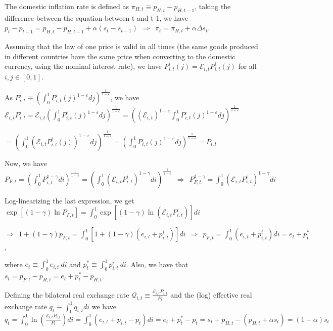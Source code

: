 \documentclass[
]{article}
\begin{document}
The domestic inflation rate is defined as
\(\displaystyle \pi_{H,t} \equiv p_{H,t}-p_{H,t-1}\), taking the
difference between the equation between t and t-1, we have
\(p_t-p_{t-1}=p_{H,t}-p_{H,t-1}+\alpha(s_t-s_{t-1}) \ \ \Rightarrow \ \ \pi_t = \pi_{H,t}+\alpha \Delta s_t\).

Assuming that the law of one price is valid in all times (the same goods
produced in different countries have the same price when converting to
the domestic currency, using the nominal interest rate), we have
\(P_{i,t}^i(j) = \mathcal{E}_{i,t}P_{i,t}^i(j)\) for all
\(i, j \in [0,1]\).

As
\(P_{i,t}^i \equiv \displaystyle \left( \int_0^1 P_{i,t}^i(j)^{{1-\varepsilon}}dj \right) ^{\frac{1}{1-\varepsilon}}\),
we have
\(\displaystyle \mathcal{E}_{i,t}P_{i,t}^i = \mathcal{E}_{i,t} \left( \int_0^1 P_{i,t}^i(j)^{{1-\varepsilon}}dj \right) ^{\frac{1}{1-\varepsilon}} = \left( (\mathcal{E}_{i,t})^{1-\varepsilon} \int_0^1 P_{i,t}^i(j)^{{1-\varepsilon}}dj \right) ^{\frac{1}{1-\varepsilon}}\)

\(\displaystyle = \left( \int_0^1 \left( \mathcal{E}_{i,t}P_{i,t}^i(j)\right) ^{{1-\varepsilon}}dj \right) ^{\frac{1}{1-\varepsilon}} = \left( \int_0^1 P_{i,t}(j)^{{1-\varepsilon}}dj \right) ^{\frac{1}{1-\varepsilon}} = P_{i,t}\)

Now, we have
\(\displaystyle P_{F,t}= \left( \int_0^1 P_{i,t}^{{1-\gamma}}di \right) ^{\frac{1}{1-\gamma}} = \left( \int_0^1 \left( \mathcal{E}_{i,t}P_{i,t}^i \right)^{{1-\gamma}}di \right)^{\frac{1}{1-\gamma}} \ \ \Rightarrow \ \ P_{F,t}^{1-\gamma} = \int_0^1 \left( \mathcal{E}_{i,t}P_{i,t}^i \right)^{{1-\gamma}}di\)

Log-linearizing the last expression, we get
\(\displaystyle \exp \left[(1-\gamma)\ln P_{F,t} \right] = \int_0^1 \exp \left[(1-\gamma) \ln \left( \mathcal{E}_{i,t}P_{i,t}^i \right) \right]di\)

\(\Rightarrow \ \  \displaystyle 1 + (1-\gamma)p_{F,t} = \int_0^1 \left[ 1+ (1-\gamma)(e_{i,t}+p_{i,t}^i)\right]di \ \ \Rightarrow \ \ p_{F,t} = \int_0^1 (e_{i,t}+p_{i,t}^i)di=e_t+p_t^*\),

where \(\displaystyle e_t \equiv \int_0^1 e_{i,t} \ di\) and
\(\displaystyle p_t^*\equiv \int_0^1 p_{i,t}^i \ di\). Also, we have
that \(s_t = p_{F,t}-p_{H,t}=e_t + p_t^*-p_{H,t}\).

Defining the bilateral real exchange rate
\(\displaystyle \mathcal{Q}_{i,t} \equiv \frac{\mathcal{E}_{i,t}P_{i,t}}{P_t}\)
and the (log) effective real exchange rate
\(\displaystyle q_t \equiv \int_0^1 q_{i,t}di\) we have
\(\displaystyle q_t = \int_0^1 \ln \left( \frac{\mathcal{E}_{i,t}P_{i,t}}{P_t} \right)di= \int_0^1 \left(e_{i,t}+p_{i,t}-p_t \right)di = e_t+p_t^*-p_t = s_t+p_{H,t}-(p_{H,t}+\alpha s_t) = (1-\alpha)s_t\)
\end{document}
